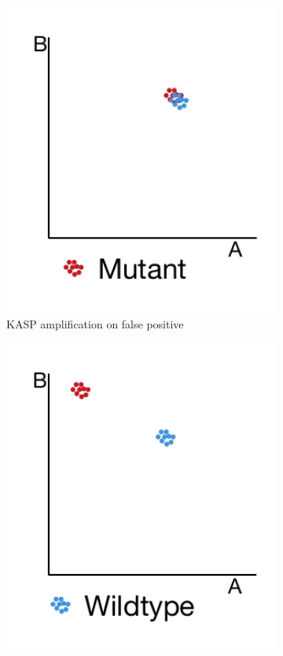 \begin{figure}
\begin{subfigure}[b]{0.3\textwidth}
        \includegraphics[width=1\textwidth]{PolyMarker/Figures/deletions/homFalse.pdf} 
        \caption{KASP amplification on false positive}
        \label{fig:poly:homFalse}
    \end{subfigure}
    \begin{subfigure}[b]{0.3\textwidth}
        \includegraphics[width=1\textwidth]{PolyMarker/Figures/deletions/homReal.pdf} 

\end{subfigure}
\end{figure}
